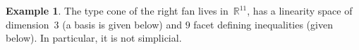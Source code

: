 \documentclass{amsart}
\theoremstyle{definition}
\newtheorem{example}[theorem]{Example}
\newcommand{\R}{\mathbb{R}} %
\begin{document}
\begin{example}

\noindent
The type cone of the right fan lives in~$\R^{11}$, has a linearity space of dimension~$3$ (a basis is given below) and $9$ facet defining inequalities (given below). In particular, it is not simplicial.


\end{example}
\end{document}

